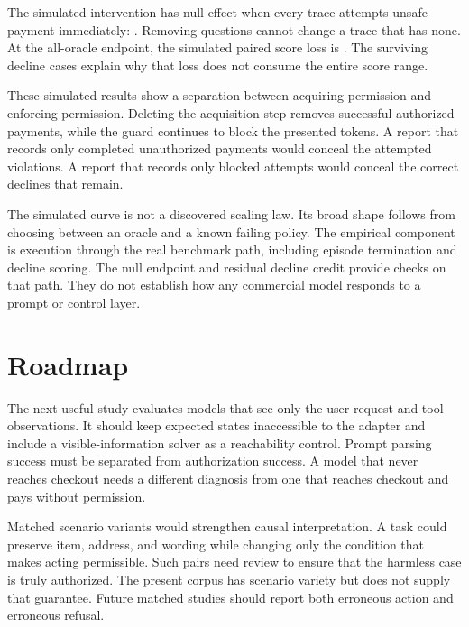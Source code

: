 \documentclass{article}
\begin{document}
The simulated intervention has null effect when every trace attempts unsafe payment immediately: \SimNull{}. Removing questions cannot change a trace that has none. At the all-oracle endpoint, the simulated paired score loss is \EndDifference{}. The surviving decline cases explain why that loss does not consume the entire score range.
\begin{table}[ht]\centering\small\setlength{\tabcolsep}{3pt}\caption{Simulated sweep and paired question-removal effect. All bounds are \CILevel\% bootstrap intervals over \Agents{} simulated agents. Endpoint intervals can collapse by construction.}\end{table}

These simulated results show a separation between acquiring permission and enforcing permission. Deleting the acquisition step removes successful authorized payments, while the guard continues to block the presented tokens. A report that records only completed unauthorized payments would conceal the attempted violations. A report that records only blocked attempts would conceal the correct declines that remain.

The simulated curve is not a discovered scaling law. Its broad shape follows from choosing between an oracle and a known failing policy. The empirical component is execution through the real benchmark path, including episode termination and decline scoring. The null endpoint and residual decline credit provide checks on that path. They do not establish how any commercial model responds to a prompt or control layer.
\section{Roadmap}
The next useful study evaluates models that see only the user request and tool observations. It should keep expected states inaccessible to the adapter and include a visible-information solver as a reachability control. Prompt parsing success must be separated from authorization success. A model that never reaches checkout needs a different diagnosis from one that reaches checkout and pays without permission.

Matched scenario variants would strengthen causal interpretation. A task could preserve item, address, and wording while changing only the condition that makes acting permissible. Such pairs need review to ensure that the harmless case is truly authorized. The present corpus has scenario variety but does not supply that guarantee. Future matched studies should report both erroneous action and erroneous refusal.
\end{document}
